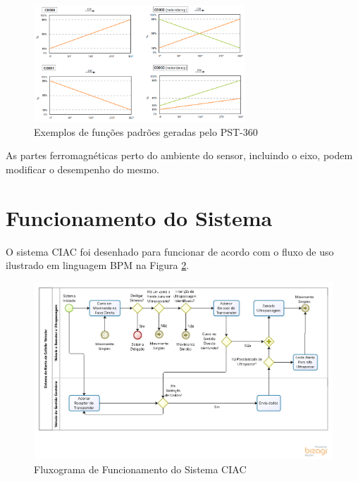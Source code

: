 
\begin{figure}[h]
  \centering
  \includegraphics[width=300px, scale=1]{figuras/pst_saida_padrao}
  \caption{ Exemplos de funções padrões geradas pelo PST-360 \cite{sensor_rotacao}}
\label{fig:pst_saida_padrao}
\end{figure}

As partes ferromagnéticas perto do ambiente do sensor, incluindo o eixo,
podem modificar o desempenho do mesmo.







\section{Funcionamento do Sistema}

O sistema CIAC foi desenhado para funcionar de acordo com o fluxo de uso ilustrado
em linguagem BPM na Figura \ref{fig:funcionamento_sistema}.

\begin{figure}[h]
  \centering
  \includegraphics[width=470px, scale=1]{figuras/funcionamento_sistema}
  \caption{Fluxograma de Funcionamento do Sistema CIAC}
\label{fig:funcionamento_sistema}
\end{figure}


